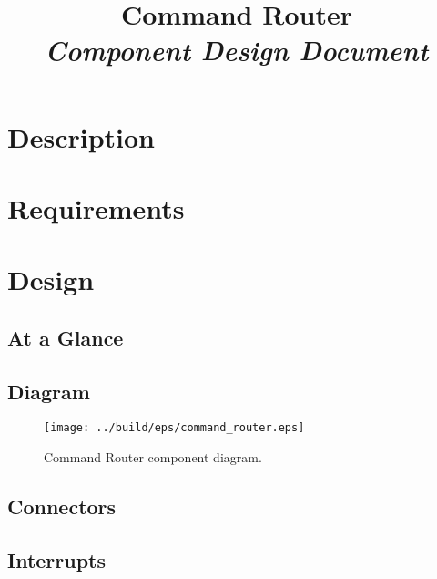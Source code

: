 



\title{\textbf{Command Router} \\
\large\textit{Component Design Document}}
\date{}
\maketitle

\section{Description}


\section{Requirements}


\section{Design}

\subsection{At a Glance}


\subsection{Diagram}
\begin{figure}[H]
  \texttt{[image: ../build/eps/command\_router.eps]}
  \caption{Command Router component diagram.}
\end{figure}



\subsection{Connectors}


\subsection{Interrupts}



